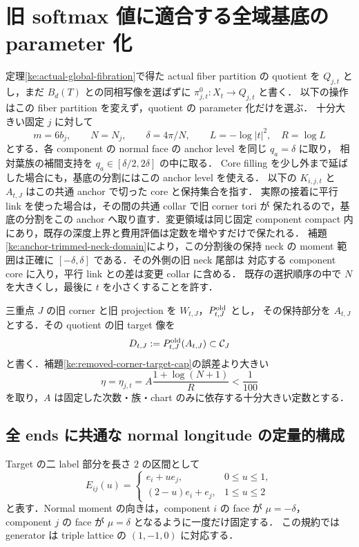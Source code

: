 \section{旧 softmax 値に適合する全域基底の parameter 化}
\label{ke:global-base-compatibility-section}

定理\ref{ke:actual-global-fibration}で得た actual fiber partition の quotient を
$Q_{j,t}$ とし，まだ $B_d(T)$ との同相写像を選ばずに
$\pi^0_{j,t}:X_t\to Q_{j,t}$ と書く．
以下の操作はこの fiber partition を変えず，quotient の parameter 化だけを選ぶ．
十分大きい固定 $j$ に対して
\[
 m=6b_j,\qquad N=N_j,\qquad \delta=4\pi/N,
 \qquad L=-\log|t|^2,\quad R=\log L
\]
とする．各 component の normal face の anchor level を同じ $q_a=\delta$ に取り，
相対葉族の補間支持を $q_a\in[\delta/2,2\delta]$ の中に取る．
Core filling を少し外まで延ばした場合にも，基底の分割にはこの anchor level を使える．
以下の $K_{i,j,t}$ と $A_{t,J}$ はこの共通 anchor で切った core と保持集合を指す．
実際の接着に平行 link を使った場合は，その間の共通 collar で旧 corner tori が
保たれるので，基底の分割をこの anchor へ取り直す．変更領域は同じ固定 component
compact 内にあり，既存の深度上界と費用評価は定数を増やすだけで保たれる．
補題\ref{ke:anchor-trimmed-neck-domain}により，この分割後の保持 neck の
moment 範囲は正確に $[-\delta,\delta]$ である．その外側の旧 neck 尾部は
対応する component core に入り，平行 link との差は変更 collar に含める．
既存の選択順序の中で $N$ を大きくし，最後に $t$ を小さくすることを許す．

三重点 $J$ の旧 corner と旧 projection を $W_{t,J}$，$P^{\rm old}_{t,J}$ とし，
その保持部分を $A_{t,J}$ とする．その quotient の旧 target 像を
\[
 D_{t,J}:=P^{\rm old}_{t,J}(A_{t,J})\subset\mathcal C_J
\]
と書く．補題\ref{ke:removed-corner-target-cap}の誤差より大きい
\begin{equation}\label{ke:eq:base-compatibility-small-scale}
 \eta=\eta_{j,t}=A\frac{1+\log(N+1)}R<\frac1{100}
\end{equation}
を取り，$A$ は固定した次数・族・chart のみに依存する十分大きい定数とする．

\subsection{全 ends に共通な normal longitude の定量的構成}

Target の二 label 部分を長さ $2$ の区間として
\[
 E_{ij}(u)=
 \begin{cases}
  e_i+u e_j,&0\le u\le1,\\
  (2-u)e_i+e_j,&1\le u\le2
 \end{cases}
\]
と表す．Normal moment の向きは，component $i$ の face が $\mu=-\delta$，
component $j$ の face が $\mu=\delta$ となるように一度だけ固定する．
この規約では generator は triple lattice の $(1,-1,0)$ に対応する．

